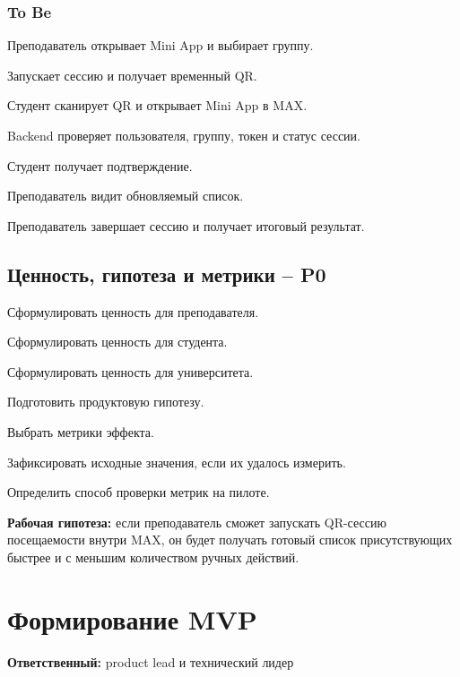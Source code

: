 \documentclass[11pt,a4paper]{article}
\newcommand{\PZero}{\textcolor{PZero}{\textbf{P0}}}
\newcommand{\owner}[1]{\textcolor{Muted}{\textbf{Ответственный:} #1}}
\begin{document}
\subsubsection{To Be}
\begin{tasklist}
  \item Преподаватель открывает Mini App и выбирает группу.
  \item Запускает сессию и получает временный QR.
  \item Студент сканирует QR и открывает Mini App в MAX.
  \item Backend проверяет пользователя, группу, токен и статус сессии.
  \item Студент получает подтверждение.
  \item Преподаватель видит обновляемый список.
  \item Преподаватель завершает сессию и получает итоговый результат.
\end{tasklist}

\subsection{Ценность, гипотеза и метрики -- \PZero}
\begin{tasklist}
  \item Сформулировать ценность для преподавателя.
  \item Сформулировать ценность для студента.
  \item Сформулировать ценность для университета.
  \item Подготовить продуктовую гипотезу.
  \item Выбрать метрики эффекта.
  \item Зафиксировать исходные значения, если их удалось измерить.
  \item Определить способ проверки метрик на пилоте.
\end{tasklist}
\begin{summarybox}
\textbf{Рабочая гипотеза:} если преподаватель сможет запускать QR-сессию посещаемости внутри MAX, он будет получать готовый список присутствующих быстрее и с меньшим количеством ручных действий.
\end{summarybox}

\section{Формирование MVP}
\owner{product lead и технический лидер}
\end{document}
